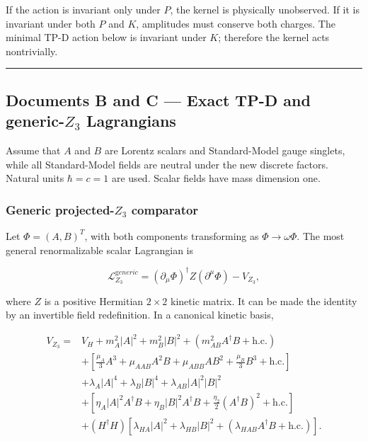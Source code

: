 \documentclass[
]{article}
\begin{document}
If the action is invariant only under \(P\), the kernel is physically
unobserved. If it is invariant under both \(P\) and \(K\), amplitudes
must conserve both charges. The minimal TP-D action below is invariant
under \(K\); therefore the kernel acts nontrivially.

\begin{center}\rule{0.5\linewidth}{0.5pt}\end{center}

\hypertarget{documents-b-and-c-exact-tp-d-and-generic-z_3-lagrangians}{%
\subsection{\texorpdfstring{Documents B and C --- Exact TP-D and
generic-\(Z_3\)
Lagrangians}{Documents B and C --- Exact TP-D and generic-Z\_3 Lagrangians}}\label{documents-b-and-c-exact-tp-d-and-generic-z_3-lagrangians}}

Assume that \(A\) and \(B\) are Lorentz scalars and Standard-Model gauge
singlets, while all Standard-Model fields are neutral under the new
discrete factors. Natural units \(\hbar=c=1\) are used. Scalar fields
have mass dimension one.

\hypertarget{generic-projected-z_3-comparator}{%
\subsubsection{\texorpdfstring{Generic projected-\(Z_3\)
comparator}{Generic projected-Z\_3 comparator}}\label{generic-projected-z_3-comparator}}

Let \(\Phi=(A,B)^T\), with both components transforming as
\(\Phi\to\omega\Phi\). The most general renormalizable scalar Lagrangian
is

\[
\mathcal L_{Z_3}^{\mathrm generic}
=(\partial_\mu\Phi)^\dagger Z(\partial^\mu\Phi)-V_{Z_3},
\]

where \(Z\) is a positive Hermitian \(2\times2\) kinetic matrix. It can
be made the identity by an invertible field redefinition. In a canonical
kinetic basis,

\[
\begin{aligned}
V_{Z_3}={}&V_H+
m_A^2|A|^2+m_B^2|B|^2
 +\left(m_{AB}^2A^\dagger B+\mathrm{h.c.}\right)\\
&+\left[\frac{\mu_A}{3}A^3+\mu_{AAB}A^2B
+\mu_{ABB}AB^2+\frac{\mu_B}{3}B^3+\mathrm{h.c.}\right]\\
&+\lambda_A|A|^4+\lambda_B|B|^4+\lambda_{AB}|A|^2|B|^2\\
&+\left[\eta_A|A|^2A^\dagger B
+\eta_B|B|^2A^\dagger B
+\frac{\eta_2}{2}(A^\dagger B)^2+\mathrm{h.c.}\right]\\
&+(H^\dagger H)\left[\lambda_{HA}|A|^2+\lambda_{HB}|B|^2
+\left(\lambda_{HAB}A^\dagger B+\mathrm{h.c.}\right)\right].
\end{aligned}
\]
\end{document}
